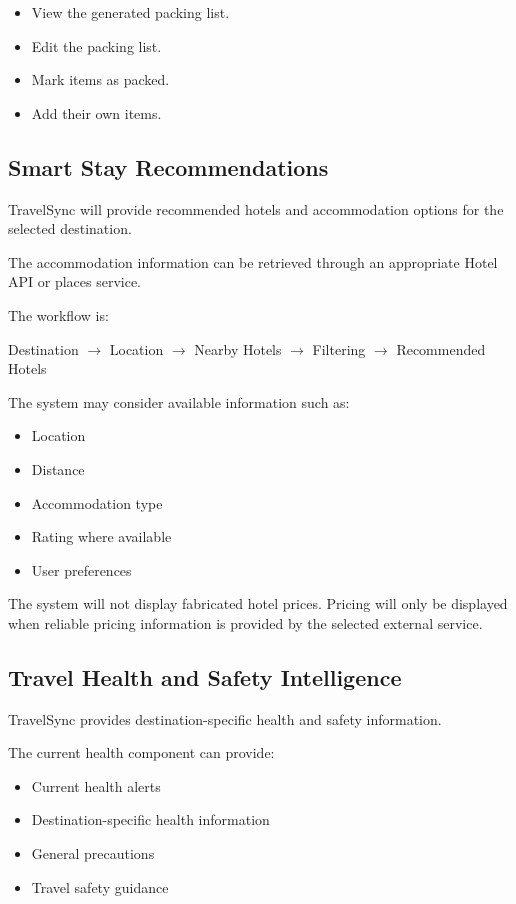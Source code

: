 \documentclass[11pt,a4paper]{article}
\begin{document}
\begin{itemize}
\item View the generated packing list.
\item Edit the packing list.
\item Mark items as packed.
\item Add their own items.
\end{itemize}


\subsection{Smart Stay Recommendations}

TravelSync will provide recommended hotels and accommodation options for the selected destination.

The accommodation information can be retrieved through an appropriate Hotel API or places service.

The workflow is:

\begin{center}
Destination
$\rightarrow$
Location
$\rightarrow$
Nearby Hotels
$\rightarrow$
Filtering
$\rightarrow$
Recommended Hotels
\end{center}

The system may consider available information such as:

\begin{itemize}
\item Location
\item Distance
\item Accommodation type
\item Rating where available
\item User preferences
\end{itemize}

The system will not display fabricated hotel prices. Pricing will only be displayed when reliable pricing information is provided by the selected external service.


\subsection{Travel Health and Safety Intelligence}

TravelSync provides destination-specific health and safety information.

The current health component can provide:

\begin{itemize}
\item Current health alerts
\item Destination-specific health information
\item General precautions
\item Travel safety guidance
\end{itemize}
\end{document}
